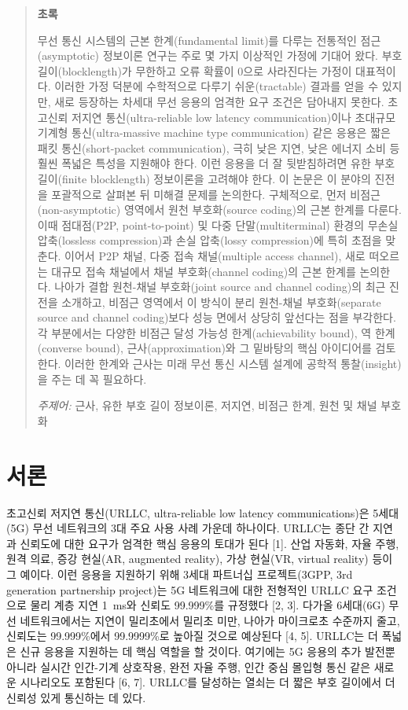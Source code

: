 \begin{quote}
\textbf{초록}\par
무선 통신 시스템의 근본 한계(fundamental limit)를 다루는 전통적인 점근(asymptotic) 정보이론 연구는 주로 몇 가지 이상적인 가정에 기대어 왔다. 부호 길이(blocklength)가 무한하고 오류 확률이 0으로 사라진다는 가정이 대표적이다. 이러한 가정 덕분에 수학적으로 다루기 쉬운(tractable) 결과를 얻을 수 있지만, 새로 등장하는 차세대 무선 응용의 엄격한 요구 조건은 담아내지 못한다. 초고신뢰 저지연 통신(ultra-reliable low latency communication)이나 초대규모 기계형 통신(ultra-massive machine type communication) 같은 응용은 짧은 패킷 통신(short-packet communication), 극히 낮은 지연, 낮은 에너지 소비 등 훨씬 폭넓은 특성을 지원해야 한다. 이런 응용을 더 잘 뒷받침하려면 유한 부호 길이(finite blocklength) 정보이론을 고려해야 한다. 이 논문은 이 분야의 진전을 포괄적으로 살펴본 뒤 미해결 문제를 논의한다. 구체적으로, 먼저 비점근(non-asymptotic) 영역에서 원천 부호화(source coding)의 근본 한계를 다룬다. 이때 점대점(P2P, point-to-point) 및 다중 단말(multiterminal) 환경의 무손실 압축(lossless compression)과 손실 압축(lossy compression)에 특히 초점을 맞춘다. 이어서 P2P 채널, 다중 접속 채널(multiple access channel), 새로 떠오르는 대규모 접속 채널에서 채널 부호화(channel coding)의 근본 한계를 논의한다. 나아가 결합 원천-채널 부호화(joint source and channel coding)의 최근 진전을 소개하고, 비점근 영역에서 이 방식이 분리 원천-채널 부호화(separate source and channel coding)보다 성능 면에서 상당히 앞선다는 점을 부각한다. 각 부분에서는 다양한 비점근 달성 가능성 한계(achievability bound), 역 한계(converse bound), 근사(approximation)와 그 밑바탕의 핵심 아이디어를 검토한다. 이러한 한계와 근사는 미래 무선 통신 시스템 설계에 공학적 통찰(insight)을 주는 데 꼭 필요하다.

\medskip
\textit{주제어:} 근사, 유한 부호 길이 정보이론, 저지연, 비점근 한계, 원천 및 채널 부호화
\end{quote}

\section{서론}

초고신뢰 저지연 통신(URLLC, ultra-reliable low latency communications)은 5세대(5G) 무선 네트워크의 3대 주요 사용 사례 가운데 하나이다. URLLC는 종단 간 지연과 신뢰도에 대한 요구가 엄격한 핵심 응용의 토대가 된다 [1]. 산업 자동화, 자율 주행, 원격 의료, 증강 현실(AR, augmented reality), 가상 현실(VR, virtual reality) 등이 그 예이다. 이런 응용을 지원하기 위해 3세대 파트너십 프로젝트(3GPP, 3rd generation partnership project)는 5G 네트워크에 대한 전형적인 URLLC 요구 조건으로 물리 계층 지연 1~ms와 신뢰도 99.999\%를 규정했다 [2, 3]. 다가올 6세대(6G) 무선 네트워크에서는 지연이 밀리초에서 밀리초 미만, 나아가 마이크로초 수준까지 줄고, 신뢰도는 99.999\%에서 99.9999\%로 높아질 것으로 예상된다 [4, 5]. URLLC는 더 폭넓은 신규 응용을 지원하는 데 핵심 역할을 할 것이다. 여기에는 5G 응용의 추가 발전뿐 아니라 실시간 인간-기계 상호작용, 완전 자율 주행, 인간 중심 몰입형 통신 같은 새로운 시나리오도 포함된다 [6, 7]. URLLC를 달성하는 열쇠는 더 짧은 부호 길이에서 더 신뢰성 있게 통신하는 데 있다.

